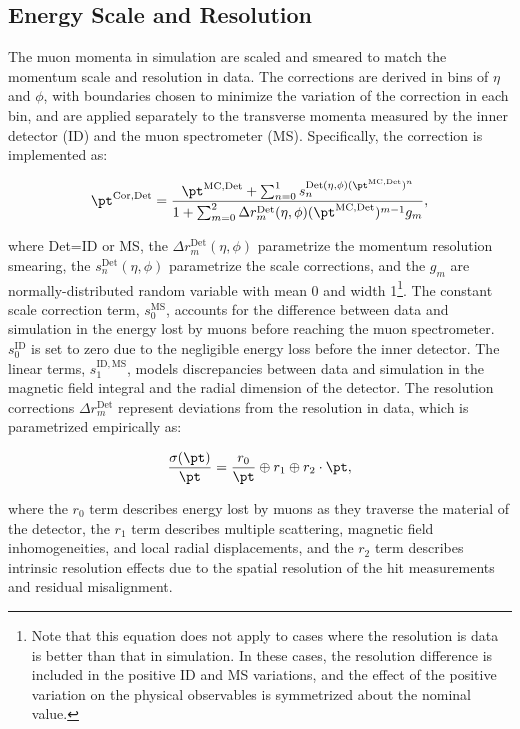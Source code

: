 \subsection{Energy Scale and Resolution}\label{sec:reco-muon-energymomentum}
The muon momenta in simulation are scaled and smeared to match the momentum scale and resolution in data. The corrections are derived in bins of $\eta$ and $\phi$, with boundaries chosen to minimize the variation of the correction in each bin, and are applied separately to the transverse momenta measured by the inner detector (ID) and the muon spectrometer (MS). Specifically, the correction is implemented as:

\begin{equation}
	\pt^{\mathrm{Cor,Det}} = \frac{\pt^{\mathrm{MC,Det}} + \sum_{n=0}^1 s_n^{\mathrm{Det}(\eta,\phi)(\pt^{\mathrm{MC,Det}})^n}}{1+\sum_{m=0}^2 \Delta r_m^{\mathrm{Det}}(\eta,\phi)(\pt^{\mathrm{MC,Det}})^{m-1}g_m},
\end{equation}

where Det=ID or MS, the $\Delta r_m^{\mathrm{Det}}(\eta,\phi)$ parametrize the momentum resolution smearing, the $s_n^{\mathrm{Det}}(\eta,\phi)$ parametrize the scale corrections, and the $g_m$ are normally-distributed random variable with mean 0 and width 1\footnote{Note that this equation does not apply to cases where the resolution is data is better than that in simulation. In these cases, the resolution difference is included in the positive ID and MS variations, and the effect of the positive variation on the physical observables is symmetrized about the nominal value.}. The constant scale correction term, $s_0^{\mathrm{MS}}$, accounts for the difference between data and simulation in the energy lost by muons before reaching the muon spectrometer. $s_0^{\mathrm{ID}}$ is set to zero due to the negligible energy loss before the inner detector. The linear terms, $s_1^{\mathrm{ID,MS}}$, models discrepancies between data and simulation in the magnetic field integral and the radial dimension of the detector. The resolution corrections $\Delta r_m^{\mathrm{Det}}$ represent deviations from the resolution in data, which is parametrized empirically as:

\begin{equation}
	\frac{\sigma(\pt)}{\pt} = \frac{r_0}{\pt} \oplus r_1 \oplus r_2\cdot\pt,
\end{equation}

where the $r_0$ term describes energy lost by muons as they traverse the material of the detector, the $r_1$ term describes multiple scattering, magnetic field inhomogeneities, and local radial displacements, and the $r_2$ term describes intrinsic resolution effects due to the spatial resolution of the hit measurements and residual misalignment. 

